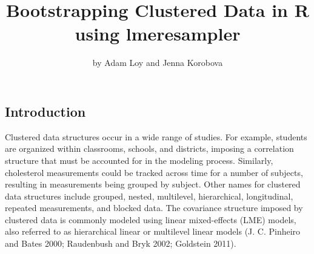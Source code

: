 \title{Bootstrapping Clustered Data in R using lmeresampler}
\author{by Adam Loy and Jenna Korobova}

\maketitle


\hypertarget{introduction}{%
\subsection{Introduction}\label{introduction}}

Clustered data structures occur in a wide range of studies. For example, students are organized within classrooms, schools, and districts, imposing a correlation structure that must be accounted for in the modeling process. Similarly, cholesterol measurements could be tracked across time for a number of subjects, resulting in measurements being grouped by subject. Other names for clustered data structures include grouped, nested, multilevel, hierarchical, longitudinal, repeated measurements, and blocked data. The covariance structure imposed by clustered data is commonly modeled using linear mixed-effects (LME) models, also referred to as hierarchical linear or multilevel linear models (J. C. Pinheiro and Bates 2000; Raudenbush and Bryk 2002; Goldstein 2011).

